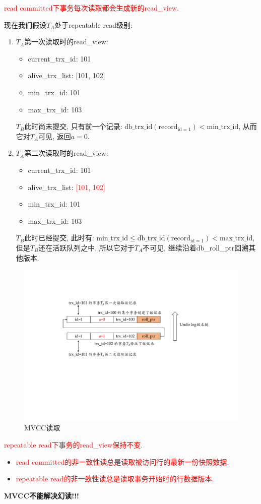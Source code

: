 \textcolor{red}{read committed下事务每次读取都会生成新的read\_view.}

现在我们假设$T_A$处于repeatable read级别:
\begin{enumerate}
    \item $T_A$第一次读取时的read\_view:
    \begin{itemize}
      \item current\_trx\_id: 101
      \item alive\_trx\_list: [101, 102]
      \item min\_trx\_id: 101
      \item max\_trx\_id: 103
    \end{itemize}
    $T_B$此时尚未提交, 只有前一个记录: $\text{db\_trx\_id}(\text{record}_{\text{id}=1})<\text{min\_trx\_id}$, 从而它对$T_A$可见, 返回$a=0$.
    \item $T_A$第二次读取时的read\_view:
    \begin{itemize}
      \item current\_trx\_id: 101
      \item alive\_trx\_list: \textcolor{red}{[101, 102]}
      \item min\_trx\_id: 101
      \item max\_trx\_id: 103
    \end{itemize}
    $T_B$此时已经提交, 此时有: $\text{min\_trx\_id}\leq \text{db\_trx\_id}(\text{record}_{\text{id}=1})<\text{max\_trx\_id}$, 但是$T_B$还在活跃队列之中, 所以它对于$T_A$不可见, 继续沿着db\_roll\_ptr回溯其他版本.
\end{enumerate}

\begin{figure}[H]
    \centering
    \includegraphics[width=.8\textwidth]{figure/MVCC-2.pdf}
    \caption{MVCC读取}
\end{figure}

\textcolor{red}{repeatable read下事务的read\_view保持不变.}

\begin{itemize}
  \item \textcolor{red}{read committed的非一致性读总是读取被访问行的最新一份快照数据.}
  \item \textcolor{red}{repeatable read的非一致性读总是读取事务开始时的行数据版本.}
\end{itemize}

\textbf{MVCC不能解决幻读!!!}
